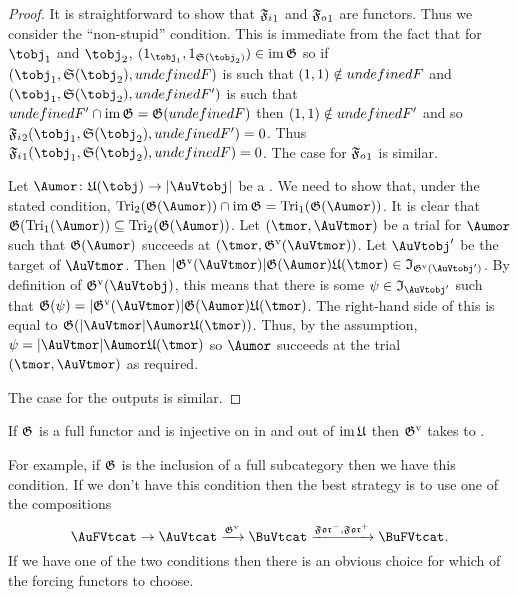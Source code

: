 \documentclass[%
a4paper,%
arxiv,%
defaults
]{myclass}
\begin{document}
\begin{proof}
It is straightforward to show that \(\mAo{\iforce}\) and \(\mAo{\oforce}\) are functors.
Thus we consider the ``non\hyp{}stupid'' condition.
This is immediate from the fact that for \tobjs \(\tobj_1\) and \(\tobj_2\), \((1_{\tobj_1}, 1_{\sfunc(\tobj_2)}) \in \im \subfunc\) so if \((\tobj_1, \sfunc(\tobj_2), \m{F})\) is such that \((1,1) \notin \m{F}\) and \((\tobj_1, \sfunc(\tobj_2), \m{F}')\) is such that \(\m{F}' \cap \im \subfunc = \subfunc(\m{F})\) then \((1,1) \notin \m{F}'\) and so \(\mBo{\iforce}(\tobj_1, \sfunc(\tobj_2), \m{F}') = 0\).
Thus \(\mAo{\iforce}(\tobj_1, \sfunc(\tobj_2), \m{F}) = 0\).
The case for \(\mAo{\oforce}\) is similar.

Let \(\Aumor \colon \ufunc(\tobj) \to \forfunc[\AuVtobj]\) be a \Aumor.
We need to show that, under the stated condition, \(\trials[_2]{\subfunc(\Aumor)} \cap \im \subfunc = \trials[_1]{\subfunc(\Aumor)}\).
It is clear that \(\subfunc(\trials[_1]{\Aumor}) \subseteq \trials[_2]{\subfunc(\Aumor)}\).
Let \((\tmor, \AuVtmor)\) be a trial for \(\Aumor\) such that \(\subfunc(\Aumor)\) succeeds at \((\tmor, \mVo{\subfunc}(\AuVtmor))\).
Let \(\AuVtobj'\) be the target of \(\AuVtmor\).
Then \(\sabs{\mVo{\subfunc}(\AuVtmor)} \subfunc(\Aumor) \ufunc(\tmor) \in \itest_{\mVo{\subfunc}(\AuVtobj')}\).
By definition of \(\mVo{\subfunc}(\AuVtobj)\), this means that there is some \(\ifn \in \itest_{\AuVtobj'}\) such that \(\subfunc(\ifn) = \sabs{\mVo{\subfunc}(\AuVtmor)} \subfunc(\Aumor) \ufunc(\tmor)\).
The right\hyp{}hand side of this is equal to \(\subfunc(\sabs{\AuVtmor} \Aumor \ufunc(\tmor))\).
Thus, by the assumption, \(\ifn = \sabs{\AuVtmor} \Aumor \ufunc(\tmor)\) so \(\Aumor\) succeeds at the trial \((\tmor, \AuVtmor)\) as required.

The case for the outputs is similar.
\end{proof}

\begin{corollary}
If \(\subfunc\) is a full functor and is injective on \Aumors in and out of \(\im \ufunc\) then \(\mVo{\subfunc}\) takes \AuFVtobjs to \BuFVtobjs. \noproof
\end{corollary}

For example, if \(\subfunc\) is the inclusion of a full subcategory then we have this condition.
If we don't have this condition then the best strategy is to use one of the compositions
%
\[
  \AuFVtcat \to \AuVtcat \xrightarrow{\mVo{\subfunc}} \BuVtcat \xrightarrow{\Jforfunc, \Mforfunc} \BuFVtcat.
\] 
%
If we have one of the two conditions then there is an obvious choice for which of the forcing functors to choose.
\end{document}
